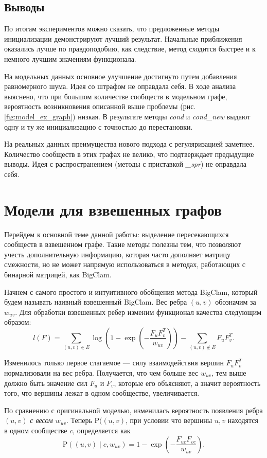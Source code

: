 \documentclass{ITaSconf}
\def\PP{\mathrm{P}}
\begin{document}
	\subsection{Выводы} 
	По итогам экспериментов можно сказать, что предложенные методы инициализации демонстрируют лучший результат.
	Начальные приближения оказались лучше по правдоподобию, как следствие, метод сходится быстрее и к немного лучшим значениям функционала.
	
	На модельных данных основное улучшение достигнуто путем добавления равномерного шума.
	Идея со штрафом не оправдала себя.
	В ходе анализа выяснено, что при большом количестве сообществ в модельном графе, вероятность возникновения описанной выше проблемы (рис. \ref{fig:model_ex_graph}) низкая.
	В результате методы \textit{cond} и \textit{cond\_new} выдают одну и ту же инициализацию с точностью до перестановки.
	
	На реальных данных преимущества нового подхода с регуляризацией заметнее.
	Количество сообществ в этих графах не велико, что подтверждает предыдущие выводы.
	Идея с распространением (методы с приставкой \textit{\_spr}) не оправдала себя.
	
	\section{Модели для взвешенных графов}
	
	Перейдем к основной теме данной работы: выделение пересекающихся сообществ в взвешенном графе.
	Такие методы полезны тем, что позволяют учесть дополнительную информацию, которая часто дополняет матрицу смежности, но не может напрямую использоваться в методах, работающих с бинарной матрицей, как BigClam.
	
	Начнем с самого простого и интуитивного обобщения метода BigClam, который будем называть наивный взвешенный BigClam.
	Вес ребра $(u,v)$ обозначим за $w_{uv}$.
	Для обработки взвешенных ребер изменим функционал качества следующим образом:
	$$l(F) = \sum_{(u,v)\in E} \log\left(1 - \exp\left( - \dfrac{F_{u} F_{v}^T}{w_{uv}}\right)\right) - \sum_{(u,v) \notin E} F_{u} F_{v}^T.$$
	
	Изменилось только первое слагаемое --- силу взаимодействия вершин $F_u F_v^T$ нормализовали на вес ребра.
	Получается, что чем больше вес $w_{uv}$, тем выше должно быть значение сил $F_u$ и $F_v$, которые его объясняют, а значит вероятность того, что вершины лежат в одном сообществе, увеличивается.
	
	По сравнению с оригинальной моделью, изменилась вероятность появления ребра $(u,v)$ \textit{с весом $w_{uv}$}.
	Теперь $\PP((u,v)$, при условии что вершины $u,v$ находятся в одном сообществе $c$, определяется как
	$$\PP((u,v) \mid c, w_{uv})=1 - \exp\left(-\dfrac{F_{uc} F_{vc}}{w_{uv}}\right).$$
	
\end{document}
